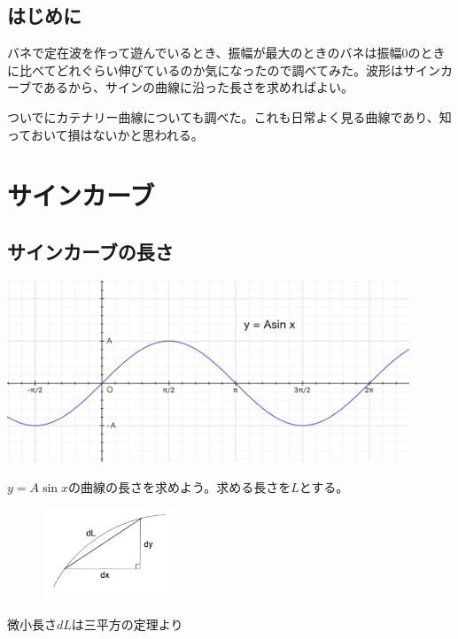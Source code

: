 \newpage
\section*{はじめに}
バネで定在波を作って遊んでいるとき、振幅が最大のときのバネは振幅0のときに比べてどれぐらい伸びているのか気になったので調べてみた。波形はサインカーブであるから、サインの曲線に沿った長さを求めればよい。\par
ついでにカテナリー曲線についても調べた。これも日常よく見る曲線であり、知っておいて損はないかと思われる。

\chapter{サインカーブ}

\section{サインカーブの長さ}
\vspace{1zw}
\begin{center}
  \includegraphics[width = 12cm]{nakayama/image/sine3.JPG}
\end{center}
\vspace{1zw}\par
$y = A \sin x$の曲線の長さを求めよう。求める長さを$L$とする。\par
\begin{figure}
\begin{center}
\includegraphics[width = 4cm]{nakayama/image/dL.jpg}
\end{center}
\end{figure}
微小長さ$dL$は三平方の定理より

